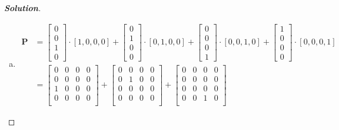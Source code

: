 \documentclass[11pt]{article}
\renewcommand{\vec}[1]{\mathbf{#1}}
\newenvironment{solution}{%
  \begin{proof}[\textbf{Solution}]$ $\par\nobreak\ignorespaces
}{%
  \end{proof}
}
\theoremstyle{definition}
\begin{document}
\begin{solution}
\begin{enumerate}[(a)]
    \item \begin{align*}
        \vec{P} &= \begin{bmatrix*}0 \\ 0 \\ 1 \\ 0\end{bmatrix*}\cdot [1, 0, 0, 0]
        + \begin{bmatrix*}0 \\ 1 \\ 0 \\ 0\end{bmatrix*} \cdot [0, 1, 0, 0]
        + \begin{bmatrix*}0 \\ 0 \\ 0 \\ 1\end{bmatrix*} \cdot [0, 0, 1, 0]
        + \begin{bmatrix*}1 \\ 0 \\ 0 \\ 0\end{bmatrix*} \cdot [0, 0, 0, 1] \\
        &= \begin{bmatrix*}
            0 & 0 & 0 & 0 \\
            0 & 0 & 0 & 0 \\
            1 & 0 & 0 & 0 \\
            0 & 0 & 0 & 0 \\
            \end{bmatrix*} 
            + \begin{bmatrix*}
            0 & 0 & 0 & 0 \\
            0 & 1 & 0 & 0 \\
            0 & 0 & 0 & 0 \\
            0 & 0 & 0 & 0 \\
            \end{bmatrix*}
            + \begin{bmatrix*}
            0 & 0 & 0 & 0 \\
            0 & 0 & 0 & 0 \\
            0 & 0 & 0 & 0 \\
            0 & 0 & 1 & 0 \\
            \end{bmatrix*}

\end{align*}
\end{enumerate}
\end{solution}
\end{document}
